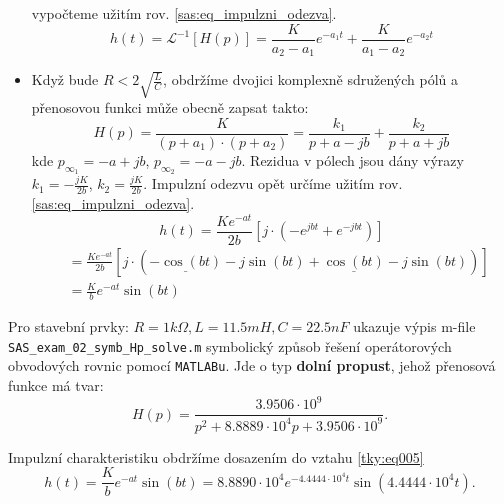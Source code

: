 \begin{example}
\begin{itemize}
          vypočteme užitím rov. \ref{sas:eq_impulzni_odezva}.
          \begin{equation}\label{sas:eq_ht1}
            h(t)=\mathcal{L}^{-1}[H(p)]=\frac{K}{a_2-a_1}e^{-a_1t}+\frac{K}{a_1-a_2}e^{-a_2t}
          \end{equation}
    \item Když bude $R<2\sqrt{\frac{L}{C}}$, obdržíme dvojici komplexně sdružených pólů a
          pře\-no\-so\-vou funkci může obecně zapsat takto:
          \begin{equation}\label{sas:eq_ht2}
            H(p)=\frac{K}{(p+a_1)\cdot(p+a_2)}=\frac{k_1}{p+a-jb}+\frac{k_2}{p+a+jb}
          \end{equation}
          kde $p_{\infty_1}=-a+jb$, $p_{\infty_2}=-a-jb$. Rezidua v pólech jsou dány výrazy
          $k_1=-\frac{jK}{2b}$, $k_2=\frac{jK}{2b}$. Impulzní odezvu opět určíme užitím rov.
          \ref{sas:eq_impulzni_odezva}.
          \begin{equation*}
            h(t) = \frac{Ke^{-at}}{2b}\left[j\cdot\left(-e^{jbt}+e^{-jbt}\right)\right]
          \end{equation*}
          \begin{align}
            \,  &= \frac{Ke^{-at}}{2b}\left[j\cdot
            \left(\underline{-\cos(bt)}-j\sin(bt)+
            \underline{\cos(bt)}-j\sin(bt)\right)\right]                        \nonumber\\
            \,  &= \frac{K}{b}e^{-at}\sin(bt)                                   \label{tky:eq005}
          \end{align}
  \end{itemize}
  
  Pro stavební prvky: $R=1k\Omega, L=11.5mH, C=22.5nF$ ukazuje výpis m-file  
  \texttt{SAS\_exam\_02\_symb\_Hp\_solve.m} symbolický způsob řešení operátorových
  ob\-vo\-do\-vých rovnic pomocí \texttt{MATLABu}. Jde o typ \textbf{dolní propust}, jehož
  přenosová funkce má tvar: $$H(p)= \frac{3.9506\cdot10^9}{p^2+8.8889\cdot10^4p+3.9506\cdot10^9}.$$
    
  Impulzní charakteristiku obdržíme dosazením do vztahu \ref{tky:eq005}
  $$h(t)=\frac{K}{b}e^{-at}\sin(bt) 
  =8.8890\cdot10^4e^{-4.4444\cdot10^4t}\sin(4.4444\cdot10^4t).$$
  
    {\centering
    \captionsetup{type=figure}
     \label{SAS:fig_ImpChar}
    \par}
  

\end{example}
